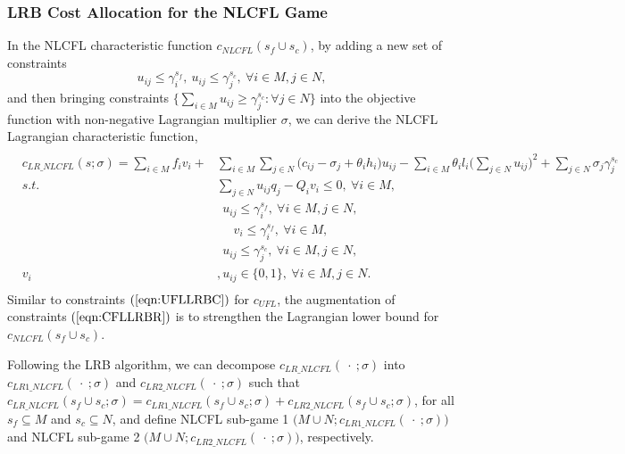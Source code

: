\documentclass[ijoc,nonblindrev]{informs3} %
\begin{document}
\subsubsection{LRB Cost Allocation for the NLCFL Game}\label{example-decompnlcfl}
In the NLCFL characteristic function $c_{NLCFL}(s_f \cup s_c)$, by adding a new set of constraints
\begin{equation}\label{eqn:CFLLRBR}
u_{ij} \leq \gamma_i^{s_f}, ~u_{ij} \leq \gamma_j^{s_c},~\forall i \in M, j \in N,
\end{equation}
and then bringing constraints $\big\{\sum_{i \in M} u_{ij} \geq \gamma_j^{s_c}:\forall j \in N\big\}$ into the objective function with non-negative Lagrangian multiplier $\sigma$, we can derive the NLCFL Lagrangian characteristic function,
\begin{eqnarray*}\label{eqn:LRCFnonlinear}
\begin{aligned}
\begin{split}
c_{LR\_NLCFL}(s;\sigma) = \sum_{i \in M}f_iv_i + &\sum_{i \in M} \sum_{j \in N} \big(c_{ij} - \sigma_{j} + \theta_ih_i\big)u_{ij}
 - \sum_{i \in M} \theta_il_i \big( \sum_{j \in N}u_{ij}\big)^2 + \sum_{j \in N} \sigma_j \gamma_j^{s_c}\\
s.t.~&\sum_{j \in N}u_{ij}q_j - Q_iv_i \leq 0,~\forall i \in M,\\
~~~~~~&~~u_{ij} \leq \gamma_i^{s_f},~\forall i \in M, j \in N,\\
~~~&~~~~~~v_i \leq \gamma_i^{s_f},~\forall i \in M,\\
~~~~~~&~~u_{ij} \leq \gamma_j^{s_c},~\forall i \in M, j \in N,\\
v_i&, u_{ij} \in \{0,1\}, ~\forall i \in M, j \in N.
\end{split}
\end{aligned}
\end{eqnarray*}
Similar to constraints $(\ref{eqn:UFLLRBC})$ for $c_{UFL}$, the augmentation of constraints $(\ref{eqn:CFLLRBR})$ is to strengthen the Lagrangian lower bound for $c_{NLCFL}(s_f \cup s_c)$.

Following the LRB algorithm, we can decompose $c_{LR\_NLCFL}(\ \cdot\ ;\sigma)$ into $c_{LR1\_NLCFL}(\ \cdot\ ;\sigma)$ and $c_{LR2\_NLCFL}(\ \cdot\ ;\sigma)$ such that $c_{LR\_NLCFL}(s_f \cup s_c;\sigma) = c_{LR1\_NLCFL}(s_f \cup s_c;\sigma) + c_{LR2\_NLCFL}(s_f \cup s_c;\sigma)$, for all $s_f \subseteq M$ and $s_c \subseteq N$, and define NLCFL sub-game 1 $\big(M \cup N;c_{LR1\_NLCFL}(\ \cdot\ ;\sigma)\big)$ and NLCFL sub-game 2 $\big(M \cup N;c_{LR2\_NLCFL}(\ \cdot\ ;\sigma)\big)$, respectively.
\end{document}
